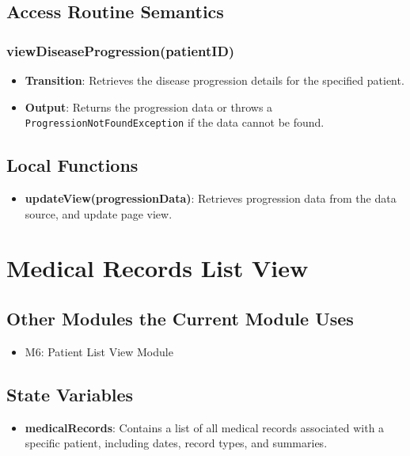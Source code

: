 \documentclass[12pt, titlepage]{article}
\begin{document}
\subsection{Access Routine Semantics}
\subsubsection{viewDiseaseProgression(patientID)}
\begin{itemize}
    \item \textbf{Transition}: Retrieves the disease progression details for the specified patient.
    \item \textbf{Output}: Returns the progression data or throws a \texttt{ProgressionNotFoundException} if the data cannot be found.
\end{itemize}

\newpage
\subsection{Local Functions}
\begin{itemize}
\item \textbf{updateView(progressionData)}: Retrieves progression data from the data source, and update page view.
\end{itemize}

\section{Medical Records List View}

\subsection{Other Modules the Current Module Uses}
\begin{itemize}
  \item M6: Patient List View Module
\end{itemize}

\subsection{State Variables}
\begin{itemize}
\item \textbf{medicalRecords}: Contains a list of all medical records associated with a specific patient, including dates, record types, and summaries.
\end{itemize}
\end{document}

